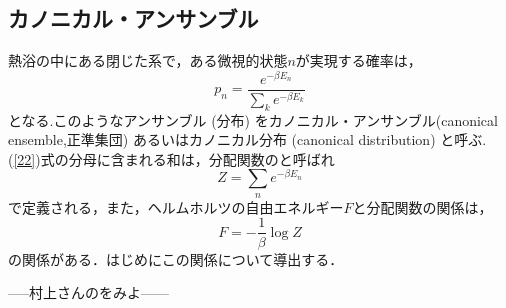 \subsection{カノニカル・アンサンブル}
熱浴の中にある閉じた系で，ある微視的状態$n$が実現する確率は，
\begin{equation}
  \label{22}
  p_n=\frac{e^{-\beta E_n}}{\sum_{k}e^{-\beta E_k}}
\end{equation}
となる.このようなアンサンブル (分布) をカノニカル・アンサンブル(canonical ensemble,正準集団) あるいはカノニカル分布 (canonical distribution) と呼ぶ.(\ref{22})式の分母に含まれる和は，分配関数のと呼ばれ
\begin{equation}
  Z=\sum_{n}e^{-\beta E_n}
\end{equation}
で定義される，また，ヘルムホルツの自由エネルギー$F$と分配関数の関係は，
\begin{equation}
  F=-\frac{1}{\beta}\log Z
\end{equation}
の関係がある．はじめにこの関係について導出する．

-----村上さんのをみよ------




